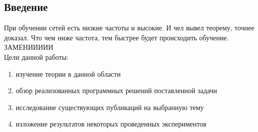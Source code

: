 \documentclass{article}
\begin{document}
    \newpage
    \begin{center} 
    \section{Введение}
    \end{center}
    \large 
    При обучении сетей есть низкие частоты и высокие. И чел вывел теорему, точнее доказал. Что чем ниже частота, тем быстрее будет происходить обучение. \\ ЗАМЕНИИИИИ\\
    Цели данной работы:\\
    \begin{enumerate} 
    \item изучение теории в данной области
    \item обзор реализованных программных решений поставленной задачи
    \item исследование существующих публикаций на выбранную тему
    \item изложение результатов некоторых проведенных экспериментов
    \end{enumerate} 
    \\
    
\end{document}
